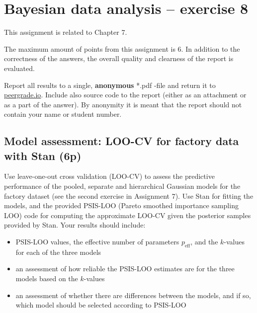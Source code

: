 \documentclass[a4paper,11pt]{article}
\begin{document}
\thispagestyle{empty}

\section*{Bayesian data analysis -- exercise 8}

This assignment is related to Chapter 7.

The maximum amount of points from this assignment is 6. In addition to the correctness of the answers, the overall quality and clearness of the report is evaluated.

Report all results to a single, {\bf anonymous} *.pdf -file and return it to \href{peergrade.io}{peergrade.io}. Include also source code to the report (either as an attachment or as a part of the answer). By anonymity it is meant that the report should not contain your name or student number.

\vspace{1cm}







\subsection*{Model assessment: LOO-CV for factory data with Stan (6p)}

Use leave-one-out cross validation (LOO-CV) to assess the predictive performance of the pooled, separate and hierarchical Gaussian models for the factory dataset (see the second exercise in Assignment 7).
Use Stan for fitting the models, and the provided PSIS-LOO (Pareto smoothed importance sampling LOO) code for computing the approximate LOO-CV given the posterior samples provided by Stan. Your results should include:
\begin{itemize}
	\item PSIS-LOO values, the effective number of parameters $p_\text{eff}$, and the $k$-values for each of the three models
	\item an assessment of how reliable the PSIS-LOO estimates are for the three models based on the $k$-values
	\item an assessment of whether there are differences between the models, and if so, which model should be selected according to PSIS-LOO
\end{itemize}
\end{document}
